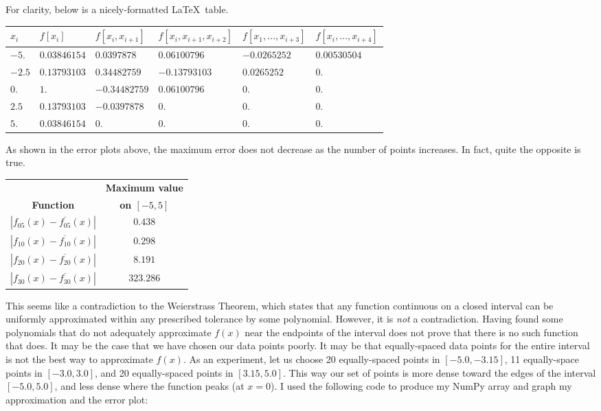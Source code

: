 \documentclass[12pt]{article}
\begin{document}
For clarity, below is a nicely-formatted \LaTeX \ table.
\begin{table}[H]
    \centering
    \begin{tabular}{||l|l|l|l|l|l||}\hline\hline
    $x_i$ & $f[x_i]$ & $f[x_i, x_{i+1}]$ & $f[x_i, x_{i+1}, x_{i+2}]$ & $f[x_1, \dots, x_{i+3}]$ & $f[x_i, \dots, x_{i+4}]$ \\\hline\hline
$-5.$ & $0.03846154$ & $0.0397878$ & $0.06100796$ & $-0.0265252$ & $0.00530504$ \\\hline
$-2.5$ & $0.13793103$ & $0.34482759$ & $-0.13793103$ & $0.0265252$ & $0.$ \\\hline
$0.$ & $1.$ & $-0.34482759$ & $0.06100796$ & $0.$ & $0.$ \\\hline
$2.5$ & $0.13793103$ & $-0.0397878$ & $0.$ & $0.$ & $0.$ \\\hline
$5.$ & $0.03846154$ & $0.$ & $0.$ & $0.$ & $0.$ \\\hline\hline
    \end{tabular}
\end{table}
\noindent As shown in the error plots above, the maximum error does not decrease as the number of points increases.  In fact, quite the opposite is true.
\begin{table}[H]
    \centering
    \begin{tabular}{||c|c||}\hline\hline
    & {\bf Maximum value} \\
    {\bf Function} & {\bf on $[-5, 5]$} \\\hline\hline
    $|f_{05}(x) - \overline{f_{05}}(x)|$ & $0.438$ \\\hline
    $|f_{10}(x) - \overline{f_{10}}(x)|$ & $0.298$ \\\hline
    $|f_{20}(x) - \overline{f_{20}}(x)|$ & $8.191$ \\\hline
    $|f_{30}(x) - \overline{f_{30}}(x)|$ & $323.286$ \\\hline\hline        
    \end{tabular}
\end{table}
\noindent This seems like a contradiction to the Weierstrass Theorem, which states that any function continuous on a closed interval can be uniformly approximated within any prescribed tolerance by some polynomial.  However, it is {\it not} a contradiction.  Having found some polynomials that do not adequately approximate $f(x)$ near the endpoints of the interval does not prove that there is no such function that does.  It may be the case that we have chosen our data points poorly.  It may be that equally-spaced data points for the entire interval is not the best way to approximate $f(x)$.  As an experiment, let us choose 20 equally-spaced points in $[-5.0, -3.15]$, 11 equally-space points in $[-3.0, 3.0]$, and 20 equally-spaced points in $[3.15, 5.0]$.  This way our set of points is more dense toward the edges of the interval $[-5.0, 5.0]$, and less dense where the function peaks (at $x = 0$).  I used the following code to produce my NumPy array and graph my approximation and the error plot:
\end{document}
